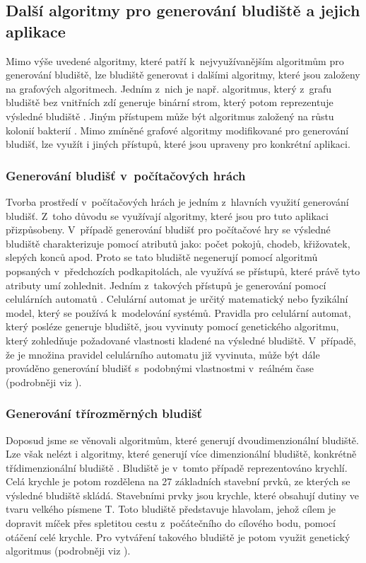 \documentclass[a4paper,12pt]{article}
\begin{document}
\subsection{Další algoritmy pro generování bludiště a jejich aplikace}
Mimo výše uvedené algoritmy, které patří k~nejvyužívanějším algoritmům pro generování bludiště, lze 
bludiště generovat i dalšími algoritmy, které jsou založeny na grafových algoritmech. Jedním z~nich je např. 
algoritmus, který z~grafu bludiště bez vnitřních zdí generuje binární strom, který potom reprezentuje výsledné bludiště \cite{mat}.
Jiným přístupem může být algoritmus založený na růstu kolonií bakterií \cite{mat}. Mimo zmíněné grafové algoritmy modifikované pro
generování bludišť, lze využít i jiných přístupů, které jsou upraveny pro konkrétní aplikaci. 

\subsubsection*{Generování bludišť v~počítačových hrách}
Tvorba prostředí v~počítačových hrách je jedním z~hlavních využití generování bludišť.
Z~toho důvodu se využívají algoritmy, které jsou pro tuto aplikaci přizpůsobeny. 
V~případě generování bludišť pro počítačové hry se výsledné bludiště charakterizuje pomocí atributů jako: počet pokojů, 
chodeb, křižovatek, slepých konců apod. Proto se tato bludiště negenerují pomocí algoritmů popsaných v~předchozích 
podkapitolách, ale využívá se přístupů, které právě tyto atributy umí zohlednit. Jedním z~takových přístupů je 
generování pomocí celulárních automatů \cite{game}. Celulární automat je určitý matematický nebo fyzikální model, který se používá 
k~modelování systémů. Pravidla pro celulární automat, který posléze generuje bludiště,
jsou vyvinuty pomocí genetického algoritmu, který zohledňuje požadované vlastnosti kladené na výsledné bludiště.
V~případě, že je množina pravidel celulárního automatu již vyvinuta, může být dále prováděno generování bludišť s~podobnými
vlastnostmi v~reálném čase (podrobněji viz \cite{game}).

\subsubsection*{Generování třírozměrných bludišť}
Doposud jsme se věnovali algoritmům, které generují dvoudimenzionální bludiště. Lze však nelézt i 
algoritmy, které generují více dimenzionální bludiště, konkrétně třídimenzionální bludiště \cite{3d}. Bludiště je v~tomto 
případě reprezentováno krychlí. Celá krychle je potom rozdělena na 27 základních stavební prvků, ze kterých se 
výsledné bludiště skládá. Stavebními prvky jsou krychle, které obsahují dutiny ve tvaru velkého písmene T. 
Toto bludiště představuje hlavolam, jehož cílem je dopravit míček přes spletitou cestu z~počátečního
do cílového bodu, pomocí otáčení celé krychle.
Pro vytváření takového bludiště je potom využit genetický algoritmus (podrobněji viz \cite{3d}).
\end{document}
